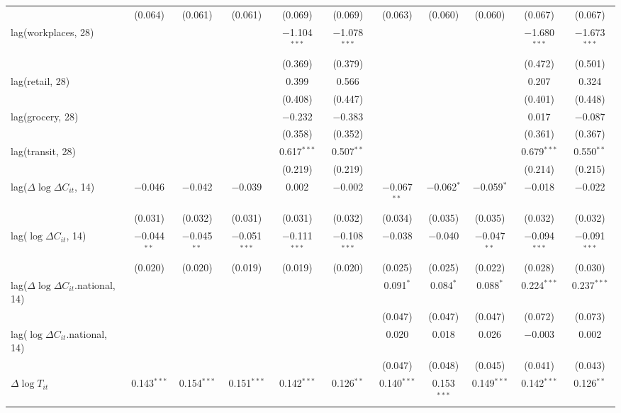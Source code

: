 \begin{tabular}{@{\extracolsep{1pt}}lcccccccccc}
  & (0.064) & (0.061) & (0.061) & (0.069) & (0.069) & (0.063) & (0.060) & (0.060) & (0.067) & (0.067) \\ 
  lag(workplaces, 28) &  &  &  & $-$1.104$^{***}$ & $-$1.078$^{***}$ &  &  &  & $-$1.680$^{***}$ & $-$1.673$^{***}$ \\ 
  &  &  &  & (0.369) & (0.379) &  &  &  & (0.472) & (0.501) \\ 
  lag(retail, 28) &  &  &  & 0.399 & 0.566 &  &  &  & 0.207 & 0.324 \\ 
  &  &  &  & (0.408) & (0.447) &  &  &  & (0.401) & (0.448) \\ 
  lag(grocery, 28) &  &  &  & $-$0.232 & $-$0.383 &  &  &  & 0.017 & $-$0.087 \\ 
  &  &  &  & (0.358) & (0.352) &  &  &  & (0.361) & (0.367) \\ 
  lag(transit, 28) &  &  &  & 0.617$^{***}$ & 0.507$^{**}$ &  &  &  & 0.679$^{***}$ & 0.550$^{**}$ \\ 
  &  &  &  & (0.219) & (0.219) &  &  &  & (0.214) & (0.215) \\ 
  lag($\Delta \log \Delta C_{it}$, 14) & $-$0.046 & $-$0.042 & $-$0.039 & 0.002 & $-$0.002 & $-$0.067$^{**}$ & $-$0.062$^{*}$ & $-$0.059$^{*}$ & $-$0.018 & $-$0.022 \\ 
  & (0.031) & (0.032) & (0.031) & (0.031) & (0.032) & (0.034) & (0.035) & (0.035) & (0.032) & (0.032) \\ 
  lag($\log \Delta C_{it}$, 14) & $-$0.044$^{**}$ & $-$0.045$^{**}$ & $-$0.051$^{***}$ & $-$0.111$^{***}$ & $-$0.108$^{***}$ & $-$0.038 & $-$0.040 & $-$0.047$^{**}$ & $-$0.094$^{***}$ & $-$0.091$^{***}$ \\ 
  & (0.020) & (0.020) & (0.019) & (0.019) & (0.020) & (0.025) & (0.025) & (0.022) & (0.028) & (0.030) \\ 
  lag($\Delta \log \Delta C_{it}$.national, 14) &  &  &  &  &  & 0.091$^{*}$ & 0.084$^{*}$ & 0.088$^{*}$ & 0.224$^{***}$ & 0.237$^{***}$ \\ 
  &  &  &  &  &  & (0.047) & (0.047) & (0.047) & (0.072) & (0.073) \\ 
  lag($\log \Delta C_{it}$.national, 14) &  &  &  &  &  & 0.020 & 0.018 & 0.026 & $-$0.003 & 0.002 \\ 
  &  &  &  &  &  & (0.047) & (0.048) & (0.045) & (0.041) & (0.043) \\ 
  $\Delta \log T_{it}$ & 0.143$^{***}$ & 0.154$^{***}$ & 0.151$^{***}$ & 0.142$^{***}$ & 0.126$^{**}$ & 0.140$^{***}$ & 0.153$^{***}$ & 0.149$^{***}$ & 0.142$^{***}$ & 0.126$^{**}$ \\ 

\end{tabular}

